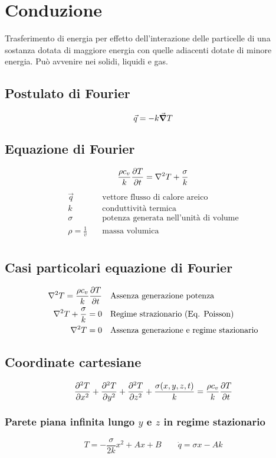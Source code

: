 \section{Conduzione}
Trasferimento di energia per effetto dell'interazione delle particelle di una sostanza dotata di maggiore energia con quelle adiacenti dotate di minore energia.
Può avvenire nei solidi, liquidi e gas.
\subsection{Postulato di Fourier}
\[ \vec{q} = - k \gradient{T} \]

\subsection{Equazione di Fourier}
\[ \frac{\rho c_v}{k} \pdv{T}{t} = \laplacian{T} + \frac{\sigma}{k} \]
\begin{align*}
\vec{q} & \quad \text{vettore flusso di calore areico} \\
k & \quad \text{conduttività termica} \\
\sigma & \quad \text{potenza generata nell'unità di volume} \\
\rho = \frac{1}{v} & \quad \text{massa volumica} \\
\end{align*}

\subsection{Casi particolari equazione di Fourier}
\begin{align*}
\laplacian{T} = \frac{\rho c_v}{k} \pdv{T}{t} & \quad \text{Assenza generazione potenza} \\
\laplacian{T} + \frac{\sigma}{k} = 0 & \quad \text{Regime strazionario (Eq. Poisson)}\\
\laplacian{T} = 0 & \quad \text{Assenza generazione e regime stazionario}\\
\end{align*}

\subsection{Coordinate cartesiane}
\[ \pdv[2]{T}{x} + \pdv[2]{T}{y} + \pdv[2]{T}{z} + \frac{\sigma(x,y,z,t)}{k} = \frac{\rho c_v}{k}\pdv{T}{t} \]
\subsubsection{Parete piana infinita lungo $y$ e $z$ in regime stazionario}
\[ T = -\frac{\sigma}{2k}x^2 + Ax + B \qquad \dot{q} = \sigma x - Ak \]


